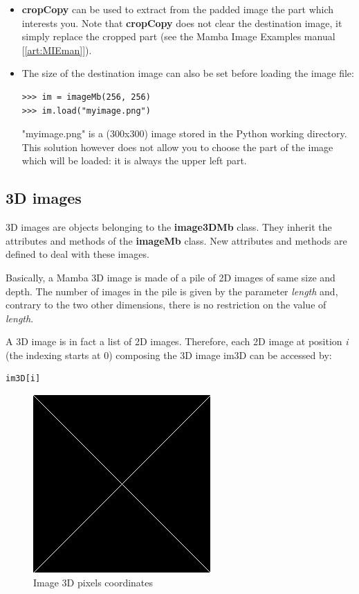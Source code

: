 \documentclass[a4paper,10pt,oneside]{article}
\begin{document}
\begin{itemize}
\item \textbf{cropCopy} can be used to extract from the padded image the part which interests you. Note that
\textbf{cropCopy} does not clear the destination image, it simply replace the cropped part (see the Mamba
Image Examples manual [\ref{art:MIEman}]).
\item The size of the destination image can also be set before loading the image file:

\lstset{language=Python}
\begin{lstlisting}
>>> im = imageMb(256, 256)
>>> im.load("myimage.png")
\end{lstlisting}

"myimage.png" is a (300x300) image stored in the Python working directory. This solution however does not allow you
to choose the part of the image which will be loaded: it is always the upper left part.
\end{itemize}

\subsection{3D images}
3D images are objects belonging to the \textbf{image3DMb} class. They inherit the attributes and methods of the
\textbf{imageMb} class. New attributes and methods are defined to deal with these images.

Basically, a Mamba 3D image is made of a pile of 2D images of same size and depth. The number of images in
the pile is given by the parameter \textit{length} and, contrary to the two other dimensions, there is no restriction
on the value of \textit{length}.

A 3D image is in fact a list of 2D images. Therefore, each 2D image at position \emph{i} (the indexing starts at 0) composing the 3D image im3D can
be accessed by:

\lstset{language=Python}
\begin{lstlisting}
im3D[i]
\end{lstlisting}

\begin{figure}
\centering
\includegraphics[scale=0.3]{figures/xxx.png}
\caption{Image 3D pixels coordinates}
\label{fig:image3D_coord}
\end{figure}
\end{document}
